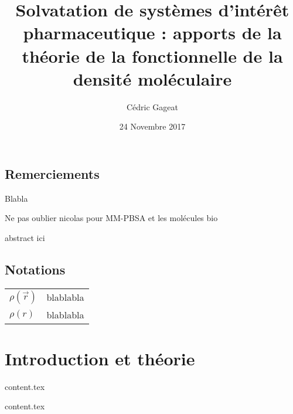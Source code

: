 \documentclass{bredele}
\title{Solvatation de systèmes d’intérêt pharmaceutique : apports de la théorie de la fonctionnelle de la densité moléculaire}
\author{Cédric Gageat}
\institute{\'Ecole Normale Supérieure}
\date{24 Novembre 2017}
\begin{document}
\tikzexternaldisable
\maketitle{}
\tikzexternalenable


\cleardoublepage
	
\frontmatter
\chapter*{Remerciements}
Blabla

Ne pas oublier nicolas pour MM-PBSA et les molécules bio

\clearpage

abstract ici

\clearemptydoublepage



\renewcommand\contentsname{Sommaire}
\tableofcontents
 
 
\renewcommand{\cftdotsep}{\cftnodots}
\cleardoublepage
\listoffigures
\cleardoublepage
\listoftables


\clearemptydoublepage
\chapter*{Notations}
\thispagestyle{empty}
\begin{tabular}{ll}
$\rho(\vec{r})$ & blablabla \\
$\rho(r)$ & blablabla 
\end{tabular}




\clearemptydoublepage
\mainmatter

\part{Introduction et théorie}

\clearemptydoublepage
{content.tex}

\clearemptydoublepage
{content.tex}
\end{document}
